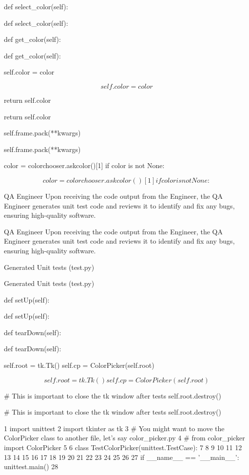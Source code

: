 \documentclass[12pt]{article}
\begin{document}
def select_color(self):


def select\_color(self):


def get_color(self):


def get\_color(self):


self.color = color


\begin{equation}
self.color = color
\end{equation}


return self.color


return self.color


self.frame.pack(**kwargs)


self.frame.pack(**kwargs)


color = colorchooser.askcolor()[1]
if color is not None:


\begin{equation}
color = colorchooser.askcolor()[1]
if color is not None:
\end{equation}


QA Engineer Upon receiving the code output from the Engineer, the QA Engineer generates unit
test code and reviews it to identify and fix any bugs, ensuring high-quality software.


QA Engineer Upon receiving the code output from the Engineer, the QA Engineer generates unit
test code and reviews it to identify and fix any bugs, ensuring high-quality software.


Generated Unit tests (test.py)


Generated Unit tests (test.py)


def setUp(self):


def setUp(self):


def tearDown(self):


def tearDown(self):


self.root = tk.Tk()
self.cp = ColorPicker(self.root)


\begin{equation}
self.root = tk.Tk()
self.cp = ColorPicker(self.root)
\end{equation}


# This is important to close the tk window after tests
self.root.destroy()


\# This is important to close the tk window after tests
self.root.destroy()


1 import unittest
2 import tkinter as tk
3 # You might want to move the ColorPicker class to another file, let’s say color_picker.py
4 # from color_picker import ColorPicker
5
6 class TestColorPicker(unittest.TestCase):
7
8
9
10
11
12
13
14
15
16
17
18
19
20
21
22
23
24
25
26
27 if __name__ == ’__main__’:
unittest.main()
28
\end{document}
